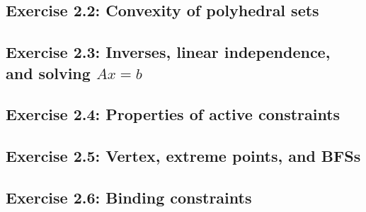 \subsection*{Exercise 2.2: Convexity of polyhedral sets}


\subsection*{Exercise 2.3: Inverses, linear independence, and solving $Ax = b$} 


\subsection*{Exercise 2.4: Properties of active constraints}


\subsection*{Exercise 2.5: Vertex, extreme points, and BFSs}


\subsection*{Exercise 2.6: Binding constraints} 


 

